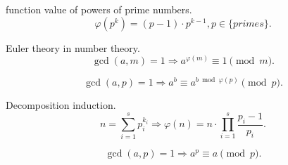 

 function value of powers of prime numbers.
\begin{equation}
\varphi(p^k)=(p-1)\cdot p^{k-1}, p\in \{primes\}.
\end{equation}

 Euler theory in number theory.
\begin{equation}
\gcd(a,m)=1 \Rightarrow a^{\varphi(m)}\equiv 1\pmod m.
\end{equation}

\begin{equation}
\gcd(a,p)=1 \Rightarrow a^{b}\equiv a^{b \bmod \varphi(p)}\pmod p.
\end{equation}

 Decomposition induction.
\begin{equation}
n=\sum_{i=1}^s p_{i}^{k_i} \Rightarrow \varphi(n)=n\cdot \prod_{i=1}^s \frac{p_i -1}{p_i}.
\end{equation}


\begin{equation}
\gcd(a,p)=1 \Rightarrow a^{p}\equiv a\pmod p.
\end{equation}